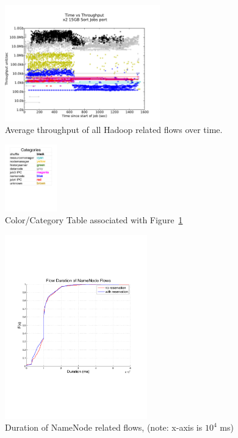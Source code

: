 \begin{figure}
\centering
\includegraphics[width=0.6\textwidth]{figures/clock_v_throughput_port.pdf}
\caption{Average throughput of all Hadoop related flows over time.}
\label{fig:tput}
\end{figure}

\begin{figure}
\centering
\includegraphics[width=0.2\textwidth]{figures/categories.pdf}
\caption{Color/Category Table associated with Figure~\ref{fig:tput}}
\label{fig:cats}
\end{figure}

\begin{figure}
\centering
\includegraphics[width=0.55\textwidth]{figures/flow_durations.pdf}
\caption{Duration of NameNode related flows, {\footnotesize (note: x-axis is $10^4$ ms)}}
\label{fig:duration_cdf}
\end{figure}

